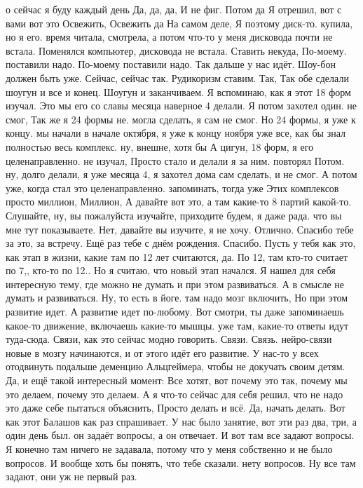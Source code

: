 о сейчас я буду каждый день Да, да, да, И не фиг. Потом да Я отрешил, вот с вами вот это Освежить, Освежить да На самом деле, Я поэтому диск-то.
купила, но я его.
время читала, смотрела, а потом что-то у меня дисковода почти не встала. Поменялся компьютер, дисковода не встала.
Ставить некуда, По-моему.
поставили надо.
По-моему поставили надо.
Так дальше у нас идёт.
Шоу-бон должен быть уже.
Сейчас, сейчас так.
Рудикоризм ставим.
Так, Так обе сделали шоугун и все и конец.
Шоугун и заканчиваем.
Я вспоминаю, как я этот 18 форм изучал.
Это мы его со славы месяца наверное 4 делали.
Я потом захотел один.
не смог, Так же я 24 формы не.
могла сделать, я сам не смог.
Но 24 формы, я уже к концу. мы начали в начале октября, я уже к концу ноября уже все, как бы знал полностью весь комплекс. ну, внешне, хотя бы А цигун, 18 форм, я его целенаправленно.
не изучал, Просто стало и делали я за ним.
повторял Потом. ну, долго делали, я уже месяца 4, я захотел дома сам сделать, и не смог. А потом уже, когда стал это целенаправленно.
запоминать, тогда уже Этих комплексов просто миллион, Миллион, А давайте вот это, а там какие-то 8 партий какой-то. Слушайте, ну, вы пожалуйста изучайте, приходите будем, я даже рада.
что вы мне тут показываете.
Нет, давайте вы изучите, я не хочу.
Отлично.
Спасибо тебе за это, за встречу.
Ещё раз тебе с днём рождения.
Спасибо.
Пусть у тебя как это, как этап в жизни, какие там по 12 лет считаются, да.
По 12, там кто-то считает по 7,, кто-то по 12..
Но я считаю, что новый этап начался. Я нашел для себя интересную тему, где можно не думать и при этом развиваться.
А в смысле не думать и развиваться.
Ну, то есть в йоге. там надо мозг включить, Но при этом развитие идет.
А развитие идет по-любому.
Вот смотри, ты даже запоминаешь какое-то движение, включаешь какие-то мышцы. уже там, какие-то ответы идут туда-сюда.
Связи, как это сейчас модно говорить.
Связи.
Связь.
нейро-связи новые в мозгу начинаются, и от этого идёт его развитие.
У нас-то у всех отодвинуть подальше деменцию Альцгеймера, чтобы не докучать своим детям.
Да, и ещё такой интересный момент: Все хотят, вот почему это так, почему мы это делаем, почему это делаем. А я что-то сейчас для себя решил, что не надо это даже себе пытаться объяснить, Просто делать и всё.
Да, начать делать.
Вот как этот Балашов как раз спрашивает.
У нас было занятие, вот эти раз два, три, а один день был. он задаёт вопросы, а он отвечает.
И вот там все задают вопросы.
Я конечно там ничего не задавала, потому что у меня собственно и не было вопросов.
И вообще хоть бы понять, что тебе сказали. нету вопросов.
Ну все там задают, они уж не первый раз.
